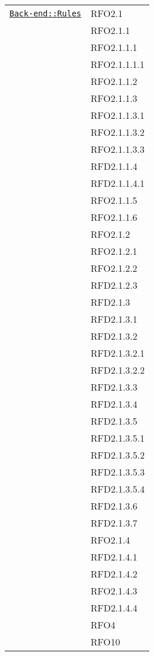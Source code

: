 \begin{longtable}{|>{\centering}m{10cm}|m{3cm}<{\centering}|}
\hyperref[Back-end::Rules]{\texttt{Back-end::Rules}} & RFO2.1\\
& RFO2.1.1\\
& RFO2.1.1.1\\
& RFO2.1.1.1.1\\
& RFO2.1.1.2\\
& RFO2.1.1.3\\
& RFO2.1.1.3.1\\
& RFO2.1.1.3.2\\
& RFO2.1.1.3.3\\
& RFD2.1.1.4\\
& RFD2.1.1.4.1\\
& RFO2.1.1.5\\
& RFO2.1.1.6\\
& RFO2.1.2\\
& RFO2.1.2.1\\
& RFO2.1.2.2\\
& RFD2.1.2.3\\
& RFD2.1.3\\
& RFD2.1.3.1\\
& RFD2.1.3.2\\
& RFD2.1.3.2.1\\
& RFD2.1.3.2.2\\
& RFD2.1.3.3\\
& RFD2.1.3.4\\
& RFD2.1.3.5\\
& RFD2.1.3.5.1\\
& RFD2.1.3.5.2\\
& RFD2.1.3.5.3\\
& RFD2.1.3.5.4\\
& RFD2.1.3.6\\
& RFD2.1.3.7\\
& RFO2.1.4\\
& RFD2.1.4.1\\
& RFD2.1.4.2\\
& RFO2.1.4.3\\
& RFD2.1.4.4\\
& RFO4\\
& RFO10\\ \hline


\end{longtable}
